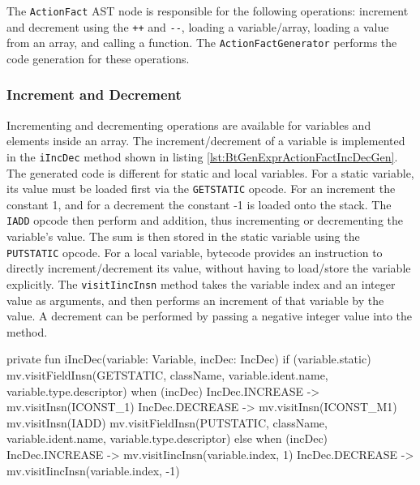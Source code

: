 The \verb|ActionFact| AST node is responsible for the following operations: increment and decrement using the \verb|++| and \verb|--|, loading a variable/array, loading a value from an array, and calling a function. The \verb|ActionFactGenerator| performs the code generation for these operations. 

\subsubsection{Increment and Decrement}

Incrementing and decrementing operations are available for variables and elements inside an array. The increment/decrement of a variable is implemented in the \verb|iIncDec| method shown in listing \ref{lst:BtGenExprActionFactIncDecGen}. The generated code is different for static and local variables. For a static variable, its value must be loaded first via the \verb|GETSTATIC| opcode. For an increment the constant 1, and for a decrement the constant -1 is loaded onto the stack. The \verb|IADD| opcode then perform and addition, thus incrementing or decrementing the variable's value. The sum is then stored in the static variable using the \verb|PUTSTATIC| opcode. For a local variable, bytecode provides an instruction to directly increment/decrement its value, without having to load/store the variable explicitly. The \verb|visitIincInsn| method takes the variable index and an integer value as arguments, and then performs an increment of that variable by the value. A decrement can be performed by passing a negative integer value into the method.


\begin{KotlinCode}[float,numbers=none,caption=Implementation of the \texttt{iIncDec} method of the \texttt{ActionFactGenerator}., label=lst:BtGenExprActionFactIncDecGen]
private fun iIncDec(variable: Variable, incDec: IncDec) {
    if (variable.static) {
        mv.visitFieldInsn(GETSTATIC, className, variable.ident.name, variable.type.descriptor)
        when (incDec) {
            IncDec.INCREASE -> mv.visitInsn(ICONST_1)
            IncDec.DECREASE -> mv.visitInsn(ICONST_M1)
        }
        mv.visitInsn(IADD)
        mv.visitFieldInsn(PUTSTATIC, className, variable.ident.name, variable.type.descriptor)
    } else {
        when (incDec) {
            IncDec.INCREASE -> mv.visitIincInsn(variable.index, 1)
            IncDec.DECREASE -> mv.visitIincInsn(variable.index, -1)
        }
    }
}
\end{KotlinCode}


